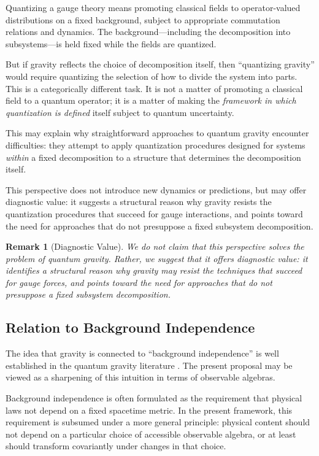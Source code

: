 \documentclass[12pt,a4paper]{article}
\newtheorem{remark}[theorem]{Remark}
\begin{document}
Quantizing a gauge theory means promoting classical fields to operator-valued distributions on a fixed background, subject to appropriate commutation relations and dynamics. The background—including the decomposition into subsystems—is held fixed while the fields are quantized.

But if gravity reflects the choice of decomposition itself, then ``quantizing gravity'' would require quantizing the selection of how to divide the system into parts. This is a categorically different task. It is not a matter of promoting a classical field to a quantum operator; it is a matter of making the \emph{framework in which quantization is defined} itself subject to quantum uncertainty.

This may explain why straightforward approaches to quantum gravity encounter difficulties: they attempt to apply quantization procedures designed for systems \emph{within} a fixed decomposition to a structure that determines the decomposition itself.

This perspective does not introduce new dynamics or predictions, but may offer diagnostic value: it suggests a structural reason why gravity resists the quantization procedures that succeed for gauge interactions, and points toward the need for approaches that do not presuppose a fixed subsystem decomposition.

\begin{remark}[Diagnostic Value]
We do not claim that this perspective solves the problem of quantum gravity. Rather, we suggest that it offers diagnostic value: it identifies a structural reason why gravity may resist the techniques that succeed for gauge forces, and points toward the need for approaches that do not presuppose a fixed subsystem decomposition.
\end{remark}

\subsection{Relation to Background Independence}

The idea that gravity is connected to ``background independence'' is well established in the quantum gravity literature \cite{Rovelli2004,Smolin2006}. The present proposal may be viewed as a sharpening of this intuition in terms of observable algebras.

Background independence is often formulated as the requirement that physical laws not depend on a fixed spacetime metric. In the present framework, this requirement is subsumed under a more general principle: physical content should not depend on a particular choice of accessible observable algebra, or at least should transform covariantly under changes in that choice.
\end{document}
